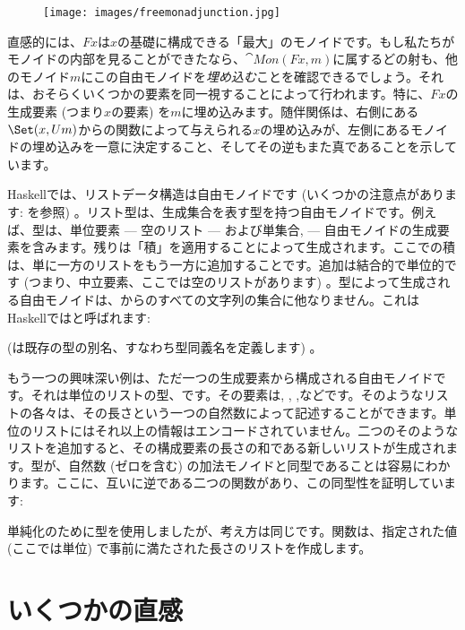 \begin{figure}[H]
  \centering
  \texttt{[image: images/freemonadjunction.jpg]}
\end{figure}

\noindent
直感的には、$F x$は$x$の基礎に構成できる「最大」のモノイドです。もし私たちがモノイドの内部を見ることができたなら、$\cat{Mon}(F x, m)$に属するどの射も、他のモノイド$m$にこの自由モノイドを\emph{埋め込む}ことを確認できるでしょう。それは、おそらくいくつかの要素を同一視することによって行われます。特に、$F x$の生成要素 (つまり$x$の要素) を$m$に埋め込みます。随伴関係は、右側にある$\Set(x, U m)$からの関数によって与えられる$x$の埋め込みが、左側にあるモノイドの埋め込みを一意に決定すること、そしてその逆もまた真であることを示しています。

Haskellでは、リストデータ構造は自由モノイドです (いくつかの注意点があります: を参照) 。リスト型\code{{[}a{]}}は、生成集合を表す型を持つ自由モノイドです。例えば、型\code{{[}Char{]}}は、単位要素 --- 空のリスト\code{{[}{]}} --- および単集合\code{{[}'a'{]}}, \code{{[}'b'{]}} --- 自由モノイドの生成要素を含みます。残りは「積」を適用することによって生成されます。ここでの積は、単に一方のリストをもう一方に追加することです。追加は結合的で単位的です (つまり、中立要素、ここでは空のリストがあります) 。型によって生成される自由モノイドは、からのすべての文字列の集合に他なりません。これはHaskellではと呼ばれます:

 (は既存の型の別名、すなわち型同義名を定義します) 。

もう一つの興味深い例は、ただ一つの生成要素から構成される自由モノイドです。それは単位のリストの型、\code{{[}(){]}}です。その要素は\code{{[}{]}}, \code{{[}(){]}}, \code{{[}(), (){]}},などです。そのようなリストの各々は、その長さという一つの自然数によって記述することができます。単位のリストにはそれ以上の情報はエンコードされていません。二つのそのようなリストを追加すると、その構成要素の長さの和である新しいリストが生成されます。型\code{{[}(){]}}が、自然数 (ゼロを含む) の加法モノイドと同型であることは容易にわかります。ここに、互いに逆である二つの関数があり、この同型性を証明しています:

単純化のために型を使用しましたが、考え方は同じです。関数は、指定された値 (ここでは単位) で事前に満たされた長さのリストを作成します。

\section{いくつかの直感}

